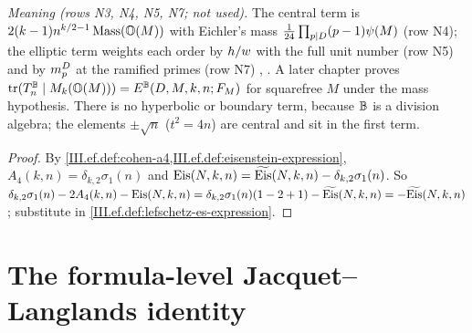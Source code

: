 \begin{definition}
\end{definition}
\noindent \emph{Meaning (rows N3, N4, N5, N7; not used).} The central term is $2(k-1)n^{k/2-1}\operatorname{Mass}(\mathbb{O}(M))$ with Eichler's mass
$\frac1{24}\prod_{p\mid D}(p-1)\psi(M)$ (row N4); the elliptic term weights each order by $h/w$ with the full unit number (row N5) and by
$m^{D}_p$ at the ramified primes (row N7) \cite[Prop.~3.1, pp.~181--182; (19)--(21), p.~180]{Shz}, \cite[Thm.~2.25, p.~359]{Piz}. A later chapter proves
$\operatorname{tr}(T^{\mathbb{B}}_n\mid M_{k}(\mathbb{O}(M)))=E^{\mathbb{B}}(D,M,k,n;F_M)$ for squarefree $M$ under the mass hypothesis. There is no hyperbolic or boundary term, because $\mathbb{B}$ is
a division algebra; the elements $\pm\sqrt n$ ($t^2=4n$) are central and sit in the first term.

\begin{lemma}
\end{lemma}
\begin{proof}
By \cref{III.ef.def:cohen-a4,III.ef.def:eisenstein-expression}, $A_4(k,n)=\delta_{k,2}\sigma_1(n)$ and $\mathrm{Eis}(N,k,n)=\widetilde{\mathrm{Eis}}(N,k,n)-\delta_{k,2}\sigma_1(n)$. So
$\delta_{k,2}\sigma_1(n)-2A_4(k,n)-\mathrm{Eis}(N,k,n)=\delta_{k,2}\sigma_1(n)(1-2+1)-\widetilde{\mathrm{Eis}}(N,k,n)=-\widetilde{\mathrm{Eis}}(N,k,n)$; substitute in
\cref{III.ef.def:lefschetz-es-expression}.
\end{proof}

\section{The formula-level Jacquet--Langlands identity}\label{sec:ef-identity}

